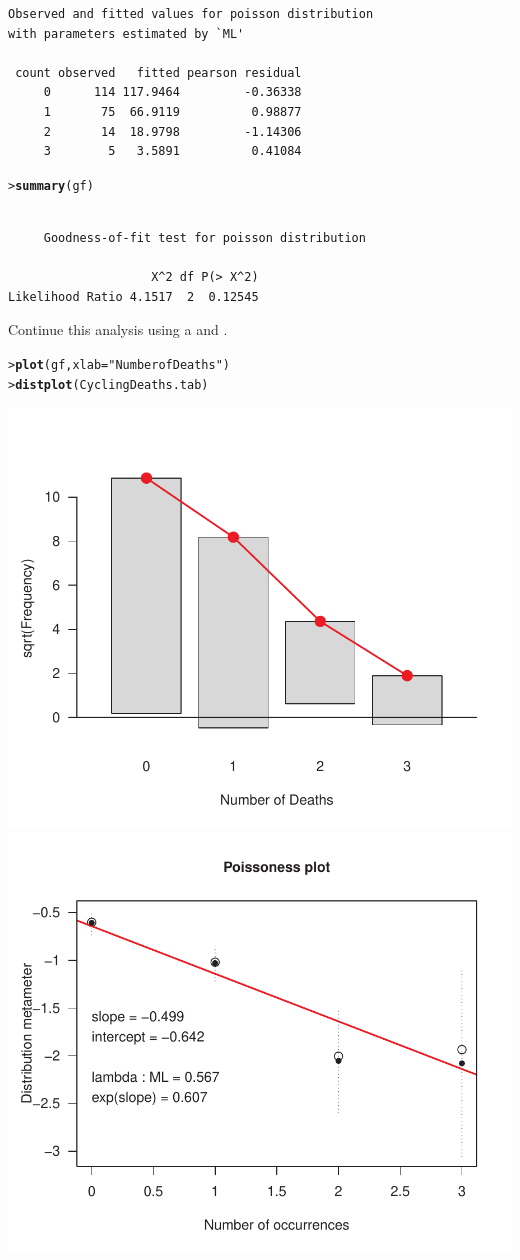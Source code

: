 \documentclass[10pt]{report}\usepackage[]{graphicx}\usepackage[]{color}
\makeatletter
\newcommand{\hlstr}[1]{\textcolor[rgb]{0.192,0.494,0.8}{#1}}%
\newcommand{\hlstd}[1]{\textcolor[rgb]{0.345,0.345,0.345}{#1}}%
\newcommand{\hlkwc}[1]{\textcolor[rgb]{0.333,0.667,0.333}{#1}}%
\newcommand{\hlkwd}[1]{\textcolor[rgb]{0.737,0.353,0.396}{\textbf{#1}}}%
\newenvironment{kframe}{%
 \def\at@end@of@kframe{}%
 \ifinner\ifhmode%
  \def\at@end@of@kframe{\end{minipage}}%
  \begin{minipage}{\columnwidth}%
 \fi\fi%
 \def\FrameCommand##1{\hskip\@totalleftmargin \hskip-\fboxsep
 \colorbox{shadecolor}{##1}\hskip-\fboxsep
     \hskip-\linewidth \hskip-\@totalleftmargin \hskip\columnwidth}%
 \MakeFramed {\advance\hsize-\width
   \@totalleftmargin\z@ \linewidth\hsize
   \@setminipage}}%
 {\par\unskip\endMakeFramed%
 \at@end@of@kframe}
\newenvironment{knitrout}{}{} %
\renewenvironment{knitrout}{\small\renewcommand{\baselinestretch}{.85}}{} %
\makeatother
\begin{document}
\begin{Exercises}
\begin{enumerate*}
\begin{ans}
\begin{knitrout}
\begin{kframe}
\begin{verbatim}
Observed and fitted values for poisson distribution
with parameters estimated by `ML' 

 count observed   fitted pearson residual
     0      114 117.9464         -0.36338
     1       75  66.9119          0.98877
     2       14  18.9798         -1.14306
     3        5   3.5891          0.41084
\end{verbatim}
\begin{alltt}
\hlstd{> }\hlkwd{summary}\hlstd{(gf)}
\end{alltt}
\begin{verbatim}

	 Goodness-of-fit test for poisson distribution

                    X^2 df P(> X^2)
Likelihood Ratio 4.1517  2  0.12545
\end{verbatim}
\end{kframe}
\end{knitrout}
    \end{ans}
    
    \item Continue this analysis using a  and .
    \begin{ans}
\begin{knitrout}\footnotesize
{}\color{fgcolor}\begin{kframe}
\begin{alltt}
\hlstd{> }\hlkwd{plot}\hlstd{(gf,} \hlkwc{xlab}\hlstd{=}\hlstr{"Number of Deaths"}\hlstd{)}
\hlstd{> }\hlkwd{distplot}\hlstd{(CyclingDeaths.tab)}
\end{alltt}
\end{kframe}

\centerline{\includegraphics[width=.5\textwidth]{soln/fig/ex3_10c-1} 
\includegraphics[width=.5\textwidth]{soln/fig/ex3_10c-2} }




\end{knitrout}
\end{ans}
\end{enumerate*}
\end{Exercises}
\end{document}

